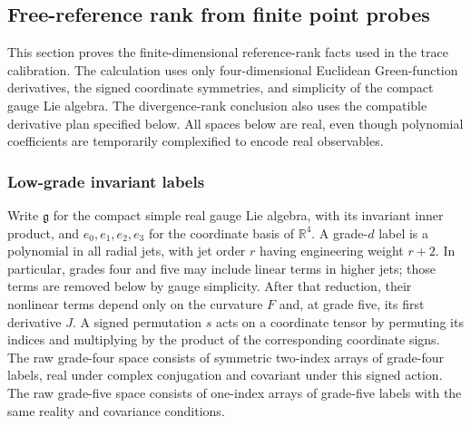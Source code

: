\subsection{Free-reference rank from finite point probes}
\label{sec:ex-lattice-trace-free-rank}

This section proves the finite-dimensional reference-rank facts used in the
trace calibration. The calculation uses only four-dimensional Euclidean
Green-function derivatives, the signed coordinate symmetries, and simplicity
of the compact gauge Lie algebra. The divergence-rank conclusion also uses
the compatible derivative plan specified below. All spaces below are real, even though
polynomial coefficients are temporarily complexified to encode real
observables.

\subsubsection{Low-grade invariant labels}

Write $\mathfrak g$ for the compact simple real gauge Lie algebra, with its
invariant inner product, and $e_0,e_1,e_2,e_3$ for the coordinate basis of
$\mathbb R^4$. A grade-$d$ label is a polynomial in all radial jets, with jet order $r$
having engineering weight $r+2$. In particular, grades four and five may
include linear terms in higher jets; those terms are removed below by gauge
simplicity. After that reduction, their nonlinear terms depend only on the
curvature $F$ and, at grade five, its first derivative $J$. A signed
permutation $s$ acts
on a coordinate tensor by permuting its indices and multiplying by the
product of the corresponding coordinate signs. The raw grade-four space
consists of symmetric two-index arrays of grade-four labels, real under
complex conjugation and covariant under this signed action. The raw grade-five
space consists of one-index arrays of grade-five labels with the same reality
and covariance conditions.

